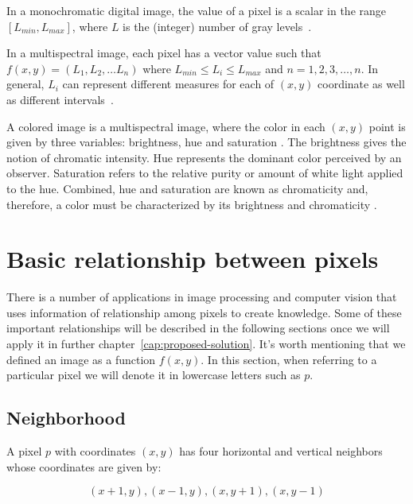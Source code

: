 In a monochromatic digital image, the value of a pixel is a scalar in the range $[L_{min}, L_{max}]$, where $L$ is the (integer) number of gray levels~\citep{pedrini:08}.

In a multispectral image, each pixel has a vector value such that $f(x, y) = (L_1, L_2, \ldots L_n)$ where $L_{min} \leq L_i \leq L_{max}$ and $n = 1, 2, 3, \ldots, n$. In general, $L_i$ can represent different measures for each of $(x, y)$ coordinate as well as different intervals~\citep{pedrini:08}.

A colored image is a multispectral image, where the color in each $(x, y)$ point is given by three variables: brightness, hue and saturation \citep{pedrini:08}. The brightness gives the notion of chromatic intensity. Hue represents the dominant color perceived by an observer. Saturation refers to the relative purity or amount of white light applied to the hue. Combined, hue and saturation are known as chromaticity and, therefore, a color must be characterized by its brightness and chromaticity \citep{gonzalez:02}.


\section{Basic relationship between pixels}
\label{sec:image_components_relation}
There is a number of applications in image processing and computer vision that uses information of relationship among pixels to create knowledge. Some of these important relationships will be described in the following sections once we will apply it in further chapter~\ref{cap:proposed-solution}. It's worth mentioning that we defined an image as a function $f(x, y)$. In this section, when referring to a particular pixel we will denote it in lowercase letters such as $p$.



\subsection{Neighborhood}
\label{sec:neighborhood}
A pixel $p$ with coordinates $(x, y)$ has four horizontal and vertical neighbors whose coordinates are given by:

\begin{equation*}
    (x + 1, y), (x - 1, y), (x, y + 1), (x, y - 1)
    \label{eq:n4_neighbors}
\end{equation*}

